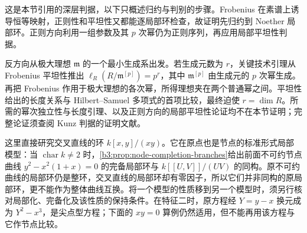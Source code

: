 \begin{proofsketch}
	这是本节引用的深层判据，以下只概述归约与判别的步骤。Frobenius 在素谱上诱导恒等映射，正则性和平坦性又都能逐局部环检查，故证明先归约到 Noether 局部环。正则方向利用一组参数及其 \(p\) 次幂仍为正则序列，再应用局部平坦性判据。

	反方向从极大理想 \(\mathfrak m\) 的一个最小生成系出发。若生成元数为 \(r\)，关键技术引理从 Frobenius 平坦性推出 \(\ell_R(R/\mathfrak m^{[p]})=p^r\)，其中 \(\mathfrak m^{[p]}\) 由生成元的 \(p\) 次幂生成。再把 Frobenius 作用于极大理想的各次幂，所得理想夹在两个普通幂之间。平坦性给出的长度关系与 Hilbert--Samuel 多项式的首项比较，最终迫使 \(r=\dim R\)。所需的幂次独立性与长度引理、以及正则方向的局部平坦性论证均不在本节证明；完整论证须查阅 Kunz 判据的证明文献\cite{Kunz1969RegularLocalRings}。
\end{proofsketch}

这里直接研究交叉直线的环 \(k[x,y]/(xy)\)。它在原点也是节点的标准形式局部模型：当 \(\operatorname{char}k\ne2\) 时，\cref{b3:prop:node-completion-branches}给出前面不可约节点曲线 \(y^2-x^2(1+x)=0\) 的完备局部环与 \(k[\![U,V]\!]/(UV)\) 的同构。原不可约曲线的局部环仍是整环，交叉直线的局部环却有零因子，所以它们并非同构的原局部环，更不能作为整体曲线互换。将一个模型的性质移到另一个模型时，须另行核对局部化、完备化及该性质的保持条件。在特征二时，原方程经 \(Y=y-x\) 换元成为 \(Y^2-x^3\)，是尖点型方程；下面的 \(xy=0\) 算例仍然适用，但不能再用该方程与它作节点比较。

